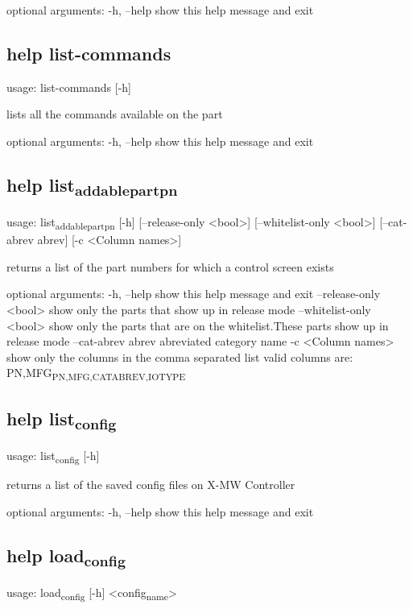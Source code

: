 \documentclass[11pt]{article}
\begin{document}
optional arguments:
  -h, --help  show this help message and exit

\subsection{help list-commands}
\label{sec:org33b1fb4}
usage: list-commands [-h]

lists all the commands available on the part

optional arguments:
  -h, --help  show this help message and exit

\subsection{help list\textsubscript{addable}\textsubscript{part}\textsubscript{pn}}
\label{sec:orgb549ce1}
usage: list\textsubscript{addable}\textsubscript{part}\textsubscript{pn}  [-h] [--release-only <bool>] [--whitelist-only <bool>]
        [--cat-abrev abrev] [-c <Column names>]

returns a list of the part numbers for which a control screen exists

optional arguments:
  -h, --help            show this help message and exit
  --release-only <bool>
                        show only the parts that show up in release mode
  --whitelist-only <bool>
                        show only the parts that are on the whitelist.These
                        parts show up in release mode
  --cat-abrev abrev     abreviated category name
  -c <Column names>     show only the columns in the comma separated list
                        valid columns are: PN,MFG\textsubscript{PN,MFG,CAT}\textsubscript{ABREV,IO}\textsubscript{TYPE}

\subsection{help list\textsubscript{config}}
\label{sec:orga467fef}
usage: list\textsubscript{config} [-h]

returns a list of the saved config files on X-MW Controller

optional arguments:
  -h, --help  show this help message and exit

\subsection{help load\textsubscript{config}}
\label{sec:orga228481}
usage: load\textsubscript{config} [-h] <config\textsubscript{name}>
\end{document}
